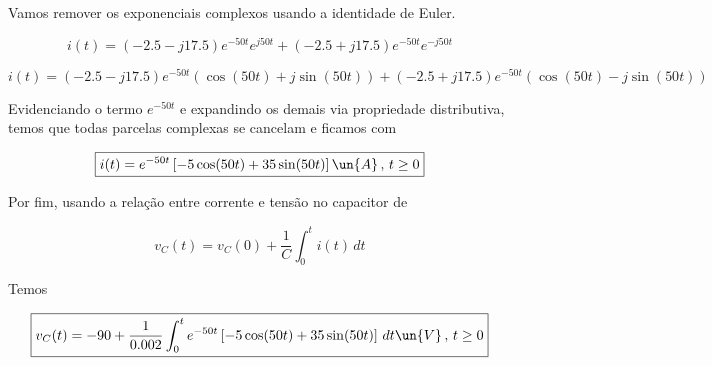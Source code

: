 Vamos remover os exponenciais complexos usando a identidade de Euler.

\[ i(t) = (-2.5 - j17.5)e^{-50t}e^{j50t} + (-2.5 + j17.5)e^{-50t}e^{-j50t} \]

\[ i(t) = (-2.5 - j17.5)e^{-50t}(\cos(50t) + j\sin(50t)) + (-2.5 + j17.5)e^{-50t}(\cos(50t) - j\sin(50t)) \]

Evidenciando o termo $e^{-50t}$ e expandindo os demais via propriedade distributiva, temos que todas 
parcelas complexas se cancelam e ficamos com

\[ \boxed{i(t) = e^{-50t}\left[-5\cos(50t) + 35\sin(50t)\right] \un{A} \, , \, t \geq 0 }  \]

Por fim, usando a relação entre corrente e tensão no capacitor de  

\[ v_C(t) = v_C(0) + \frac{1}{C} \int_{0}^{t}i(t) \, dt\]

Temos 

\[ \boxed{v_C(t) = -90 + \frac{1}{0.002} \int_{0}^{t}e^{-50t}\left[-5\cos(50t) + 35\sin(50t)\right] \, dt \un{V} \, , \, t \geq 0} \]

